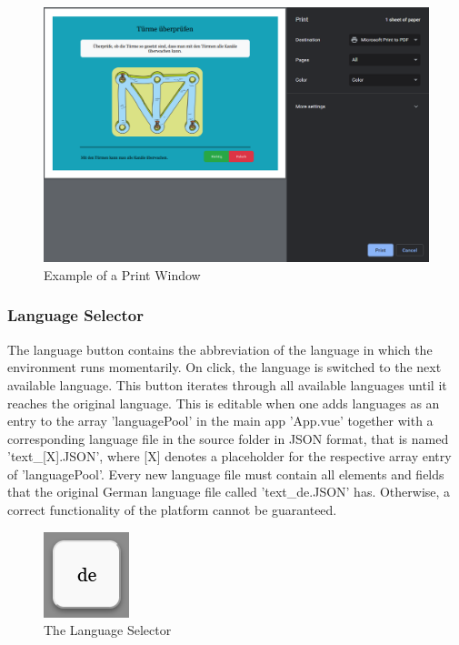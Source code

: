 \begin{figure}[h]
    \centering
    \includegraphics[width=1.0 \columnwidth]{figures/print_example.png}
    \caption{Example of a Print Window} 
    \label{fig:printex} 
\end{figure}

\subsubsection{Language Selector}
\label{subsection:language}
The language button contains the abbreviation of the language in which the environment runs momentarily. On click, the language is switched to the next available language. This button iterates through all available languages until it reaches the original language. This  is editable when one adds languages as an entry to the array 'languagePool' in the main app 'App.vue' together with a corresponding language file in the source folder in JSON format, that is named 'text\_[X].JSON', where [X] denotes a placeholder for the respective array entry of 'languagePool'. Every new language file must contain all elements and fields that the original German language file called 'text\_de.JSON' has. Otherwise, a correct functionality of the platform cannot be guaranteed.

\begin{figure}[h]
    \centering
    \includegraphics[width=0.15 \columnwidth]{figures/language.png}
    \caption{The Language Selector} 
    \label{fig:next} 
\end{figure}

